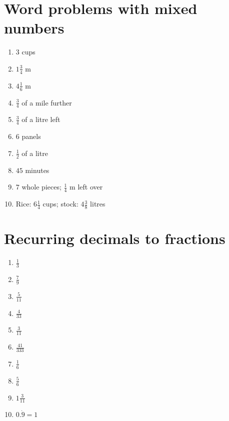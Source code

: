 \documentclass{article}
\begin{document}
\section*{Word problems with mixed numbers}
\begin{enumerate}
    \item $3$ cups
    \item $1\frac34$ m
    \item $4\frac16$ m
    \item $\frac34$ of a mile further
    \item $\frac34$ of a litre left
    \item $6$ panels
    \item $\frac12$ of a litre
    \item $45$ minutes
    \item $7$ whole pieces; $\frac14$ m left over
    \item Rice: $6\frac14$ cups; stock: $4\frac38$ litres
\end{enumerate}

\section*{Recurring decimals to fractions}
\begin{enumerate}
    \item $\frac13$
    \item $\frac79$
    \item $\frac{5}{11}$
    \item $\frac{4}{33}$
    \item $\frac{3}{11}$
    \item $\frac{41}{333}$
    \item $\frac16$
    \item $\frac56$
    \item $1\frac{3}{11}$
    \item $0.\dot{9}=1$
\end{enumerate}
\end{document}
